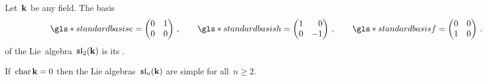 \begin{definition}
 Let~$\mathbf{k}$ be any field.
 The basis
 \[
    \gls*{standard basis e}
    =
    \begin{pmatrix}
      0 & 1 \\
      0 & 0
    \end{pmatrix} \,,
    \qquad
    \gls*{standard basis h}
    =
    \begin{pmatrix*}[r]
      1 &  0  \\
      0 & -1
    \end{pmatrix*}  \,,
    \qquad
    \gls*{standard basis f}
    =
    \begin{pmatrix}
      0 & 0 \\
      1 & 0
    \end{pmatrix} \,.
  \]
  of the Lie~algebra~$\mathfrak{sl}_2(\mathbf{k})$ is its .
\end{definition}


\begin{remark}
 If~$\operatorname{char} \mathbf{k} = 0$ then the Lie algebras~$\mathfrak{sl}_n(\mathbf{k})$ are simple for all~$n \geq 2$.
\end{remark}





